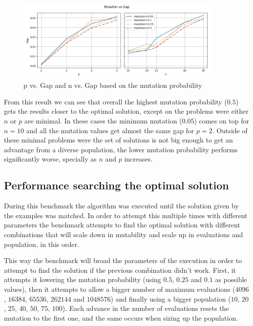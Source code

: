 \begin{figure}[h!]
  \centering
  \includegraphics[width=0.9\textwidth]{figures/mutation_vs_gap.png}
  \caption{p vs. Gap and n vs. Gap based on the mutation probability}
  \label{fig:mutation_vs_gap}
\end{figure}

From this result we can see that overall the highest mutation probability ($0.5$) gets the results
closer to the optimal solution, except on the problems were either $n$ or $p$ are minimal. In these
cases the minimum mutation ($0.05$) comes on top for $n=10$ and all the mutation values get almost
the same gap for $p=2$. Outside of these minimal problems were the set of solutions is not big
enough to get an advantage from a diverse population, the lower mutation probability performs
significantly worse, specially as $n$ and $p$ increases.

\subsection{Performance searching the optimal solution\label{ss:benchmark_optimal}}

During this benchmark the algorithm was executed until the solution given by the examples
was matched. In order to attempt this multiple times with different parameters the benchmark attempts
to find the optimal solution with different combinations that will scale down in mutability and scale up
in evaluations and population, in this order.

This way the benchmark will broad the parameters of the execution in order to attempt to find the solution
if the previous combination didn't work. First, it attempts it lowering the mutation probability (using $0.5$,
$0.25$ and $0.1$ as possible values), then it attempts to allow a bigger number of maximum evaluations
($4096$, $16384$, $65536$, $262144$ and $1048576$) and finally using a bigger population ($10$, $20$, $25$,
$40$, $50$, $75$, $100$). Each advance in the number of evaluations resets the mutation to the first one,
and the same occurs when sizing up the population.

